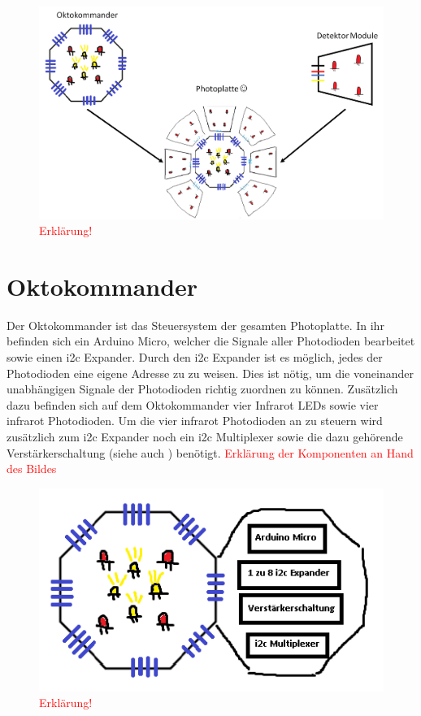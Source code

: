 \begin{figure}[h]
	\centering
	\includegraphics[scale=0.5]{../figures/Photoplatte.png}
	\caption{\textcolor{red}{Erklärung!}}
	\label{fig:Fotoplatte}
\end{figure}


\section{Oktokommander}
\label{sec:Oktokommander}

Der Oktokommander ist das Steuersystem der gesamten Photoplatte. In ihr befinden sich ein Arduino Micro, welcher die Signale aller Photodioden bearbeitet sowie einen i2c Expander. Durch den i2c Expander ist es möglich, jedes der Photodioden eine eigene Adresse zu zu weisen. Dies ist nötig, um die voneinander unabhängigen Signale der Photodioden richtig zuordnen zu können. Zusätzlich dazu befinden sich auf dem Oktokommander vier Infrarot LEDs sowie vier infrarot Photodioden. Um die vier infrarot Photodioden an zu steuern wird zusätzlich zum i2c Expander noch ein i2c Multiplexer sowie die dazu gehörende Verstärkerschaltung (siehe auch ) benötigt. 
\textcolor{red}{Erklärung der Komponenten an Hand des Bildes}

\begin{figure}[h]
	\centering
	\includegraphics[scale=0.8]{../figures/OktokommanderOffen.png}
	\caption{\textcolor{red}{Erklärung!}}
	\label{fig:OktokommanderOffen}
\end{figure}

